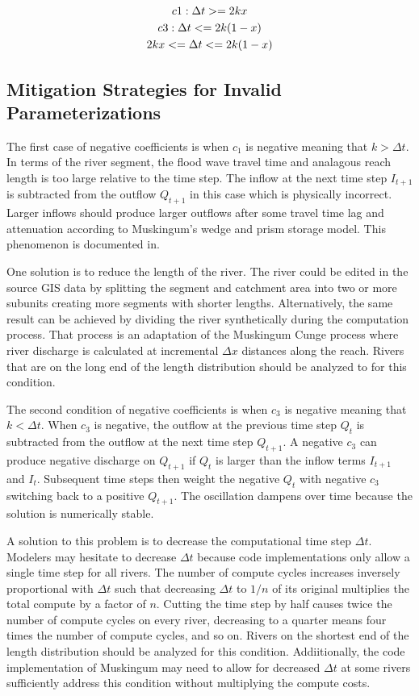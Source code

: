 \begin{gather}
  c1: \Delta t >= 2 k x \notag \\
  c3: \Delta t <= 2 k (1-x) \notag \\
  2 k x <= \Delta t <= 2 k (1-x)
  \label{eq:validity-conditions}
\end{gather}

\subsection{Mitigation Strategies for Invalid Parameterizations}
\label{subsec:mitigation-strategies}

The first case of negative coefficients is when $c_1$ is negative meaning that $k > \Delta t$.
In terms of the river segment, the flood wave travel time and analagous reach length is too large relative to the time step.
The inflow at the next time step $I_{t+1}$ is subtracted from the outflow $Q_{t+1}$ in this case which is physically incorrect.
Larger inflows should produce larger outflows after some travel time lag and attenuation according to Muskingum's wedge and prism storage model.
This phenomenon is documented in. %

One solution is to reduce the length of the river.
The river could be edited in the source GIS data by splitting the segment and catchment area into two or more subunits creating more segments with shorter lengths.
Alternatively, the same result can be achieved by dividing the river synthetically during the computation process.
That process is an adaptation of the Muskingum Cunge process where river discharge is calculated at incremental $\Delta x$ distances along the reach. %
Rivers that are on the long end of the length distribution should be analyzed to for this condition.

The second condition of negative coefficients is when $c_3$ is negative meaning that $k < \Delta t$.
When $c_3$ is negative, the outflow at the previous time step $Q_t$ is subtracted from the outflow at the next time step $Q_{t+1}$.
A negative $c_3$ can produce negative discharge on $Q_{t+1}$ if $Q_t$ is larger than the inflow terms $I_{t+1}$ and $I_t$.
Subsequent time steps then weight the negative $Q_{t}$ with negative $c_3$ switching back to a positive $Q_{t+1}$.
The oscillation dampens over time because the solution is numerically stable. %

A solution to this problem is to decrease the computational time step $\Delta t$.
Modelers may hesitate to decrease $\Delta t$ because code implementations only allow a single time step for all rivers.
The number of compute cycles increases inversely proportional with $\Delta t$ such that decreasing $\Delta t$ to $1 / n$ of its original multiplies the total compute by a factor of $n$.
Cutting the time step by half causes twice the number of compute cycles on every river, decreasing to a quarter means four times the number of compute cycles, and so on.
Rivers on the shortest end of the length distribution should be analyzed for this condition.
Addiitionally, the code implementation of Muskingum may need to allow for decreased $\Delta t$ at some rivers sufficiently address this condition without multiplying the compute costs.


